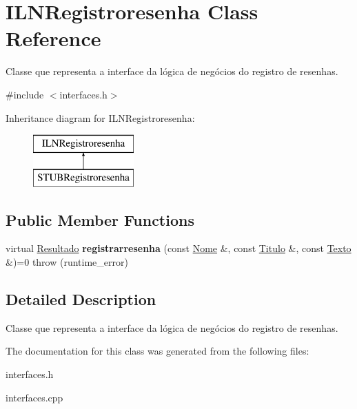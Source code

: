 \hypertarget{classILNRegistroresenha}{}\section{I\+L\+N\+Registroresenha Class Reference}
\label{classILNRegistroresenha}


Classe que representa a interface da lógica de negócios do registro de resenhas.  




{\ttfamily \#include $<$interfaces.\+h$>$}

Inheritance diagram for I\+L\+N\+Registroresenha\+:\begin{figure}[H]
\begin{center}
\leavevmode
\includegraphics[height=2.000000cm]{classILNRegistroresenha}
\end{center}
\end{figure}
\subsection*{Public Member Functions}
\begin{DoxyCompactItemize}
\item 
\mbox{\label{classILNRegistroresenha_a9949a5e396cb177a8f135f6734b517c1}} 
virtual \hyperlink{classResultado}{Resultado} {\bfseries registrarresenha} (const \hyperlink{classNome}{Nome} \&, const \hyperlink{classTitulo}{Titulo} \&, const \hyperlink{classTexto}{Texto} \&)=0  throw (runtime\+\_\+error)
\end{DoxyCompactItemize}


\subsection{Detailed Description}
Classe que representa a interface da lógica de negócios do registro de resenhas. 

The documentation for this class was generated from the following files\+:\begin{DoxyCompactItemize}
\item 
interfaces.\+h\item 
interfaces.\+cpp\end{DoxyCompactItemize}
